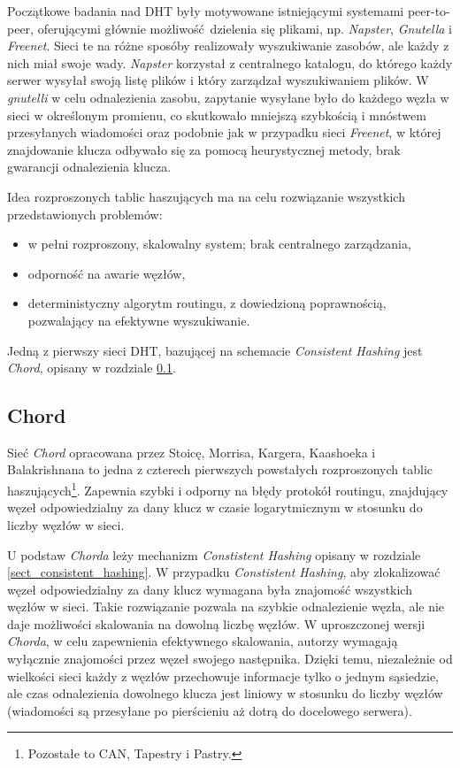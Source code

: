 \documentclass[a4paper,11pt]{scrartcl}
\begin{document}
Początkowe badania nad DHT były motywowane istniejącymi systemami peer-to-peer, oferującymi głównie możliwość dzielenia się plikami, np. \textit{Napster}, \textit{Gnutella} i \textit{Freenet}. Sieci te na różne sposóby realizowały wyszukiwanie zasobów, ale każdy z nich miał swoje wady. \textit{Napster} korzystał z centralnego katalogu, do którego każdy serwer wysyłał swoją listę plików i który zarządzał wyszukiwaniem plików. W \textit{gnutelli} w celu odnalezienia zasobu, zapytanie wysyłane było do każdego węzła w sieci w określonym promienu, co skutkowało mniejszą szybkością i mnóstwem przesyłanych wiadomości oraz podobnie jak w przypadku sieci \textit{Freenet}, w której znajdowanie klucza odbywało się za pomocą heurystycznej metody, brak gwarancji odnalezienia klucza.

Idea rozproszonych tablic haszujących ma na celu rozwiązanie wszystkich przedstawionych problemów:
\begin{itemize}
  \item w pełni rozproszony, skalowalny system; brak centralnego zarządzania,
  \item odporność na awarie węzłów,
  \item deterministyczny algorytm routingu, z dowiedzioną poprawnością, pozwalający na efektywne wyszukiwanie. 
\end{itemize} 

Jedną z pierwszy sieci DHT, bazującej na schemacie \textit{Consistent Hashing} jest \textit{Chord}, opisany w rozdziale \ref{sect_dht_chord}.

\subsection{Chord}
\label{sect_dht_chord}
Sieć \textit{Chord} opracowana przez Stoicę, Morrisa, Kargera, Kaashoeka i Balakrishnana  \cite{stoica2001chord} to jedna z czterech pierwszych powstałych rozproszonych tablic haszujących\footnote{Pozostałe to CAN\cite{ratnasamy2001scalable}, Tapestry \cite{zhao2001tapestry} i Pastry\cite{rowstron2001pastry}.}. Zapewnia szybki i odporny na błędy protokół routingu, znajdujący węzeł odpowiedzialny za dany klucz w czasie logarytmicznym w stosunku do liczby węzłów w sieci.

U podstaw \textit{Chorda} leży mechanizm \textit{Constistent Hashing} opisany w rozdziale \ref{sect_consistent_hashing}. W przypadku \textit{Constistent Hashing}, aby zlokalizować węzeł odpowiedzialny za dany klucz wymagana była znajomość wszystkich węzłów w sieci. Takie rozwiązanie pozwala na szybkie odnalezienie węzła, ale nie daje możliwości skalowania na dowolną liczbę węzłów. W uproszczonej wersji \textit{Chorda}, w celu zapewnienia efektywnego skalowania, autorzy wymagają wyłącznie znajomości przez węzeł swojego następnika. Dzięki temu, niezależnie od wielkości sieci każdy z węzłów przechowuje informacje tylko o jednym sąsiedzie, ale czas odnalezienia dowolnego klucza jest liniowy w stosunku do liczby węzłów (wiadomości są przesyłane po pierścieniu aż dotrą do docelowego serwera).
\end{document}
